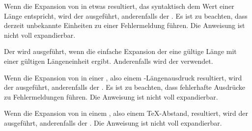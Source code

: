 \begin{Declaration}
\end{Declaration}
Wenn
die Expansion von  in etwas resultiert, das syntaktisch dem Wert
einer Länge entspricht, wird der  ausgeführt, anderenfalls
der . Es ist zu beachten, dass derzeit
unbekannte Einheiten zu einer Fehlermeldung führen. Die Anweisung ist nicht
voll expandierbar.%
\iffalse%
\iftrue%
\ Von dieser Anweisung gibt es keine interne Variante.%
\else%
\ Es gibt keine interne Variante.%
\fi%
\fi%
\EndIndexGroup


\begin{Declaration}
\end{Declaration}
Der
 wird ausgeführt, wenn die einfache Expansion der
 eine gültige Länge mit einer gültigen Längeneinheit
ergibt. Anderenfalls wird der  verwendet.%
\iffalse%
\iftrue%
\ Von dieser Anweisung gibt es keine interne Variante.%
\else%
\ Es gibt keine interne Variante.%
\fi%
\fi%
\EndIndexGroup


\begin{Declaration}
\end{Declaration}
Wenn
die Expansion von  in einer ,
also einem \eTeX-Längenausdruck resultiert, wird der 
ausgeführt, anderenfalls der . Es ist zu
beachten, dass fehlerhafte Ausdrücke zu Fehlermeldungen
führen. Die Anweisung ist nicht voll expandierbar.%
\iffalse%
\iftrue%
\ Von dieser Anweisung gibt es keine interne Variante.%
\else%
\ Es gibt keine interne Variante.%
\fi%
\fi%
\EndIndexGroup


\begin{Declaration}
\end{Declaration}
Wenn
die Expansion von  in einem , also einem \TeX-Abstand,
resultiert, wird der  ausgeführt, anderenfalls der
. Die Anweisung ist nicht voll expandierbar.%
\iffalse%
\iftrue%
\ Von dieser Anweisung gibt es keine interne Variante.%
\else%
\ Es gibt keine interne Variante.%
\fi%
\fi%
\EndIndexGroup


